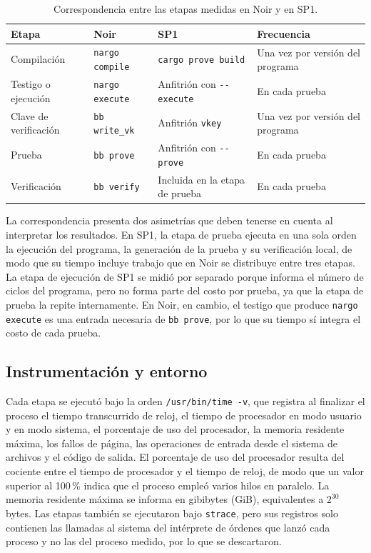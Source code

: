 \begin{table}[htbp]
	\centering
	\caption{Correspondencia entre las etapas medidas en Noir y en SP1.}
	\label{tab:metodologia_etapas}
	\small
	\begin{tabular}{>{\raggedright\arraybackslash}p{2.6cm} >{\raggedright\arraybackslash}p{4.3cm} >{\raggedright\arraybackslash}p{4.3cm} >{\raggedright\arraybackslash}p{2.6cm}}
		\toprule
		\textbf{Etapa} & \textbf{Noir} & \textbf{SP1} & \textbf{Frecuencia} \\
		\midrule
		Compilación & \texttt{nargo compile} & \texttt{cargo prove build} & Una vez por versión
		del programa \\
		\addlinespace
		Testigo o ejecución & \texttt{nargo execute} & Anfitrión con \texttt{-{}-execute} & En cada
		prueba \\
		\addlinespace
		Clave de verificación & \texttt{bb write\_vk} & Anfitrión \texttt{vkey} & Una vez por
		versión del programa \\
		\addlinespace
		Prueba & \texttt{bb prove} & Anfitrión con \texttt{-{}-prove} & En cada prueba \\
		\addlinespace
		Verificación & \texttt{bb verify} & Incluida en la etapa de prueba & En cada prueba \\
		\bottomrule
	\end{tabular}
\end{table}

La correspondencia presenta dos asimetrías que deben tenerse en cuenta al interpretar los
resultados. En SP1, la etapa de prueba ejecuta en una sola orden la ejecución del programa, la
generación de la prueba y su verificación local, de modo que su tiempo incluye trabajo que en Noir
se distribuye entre tres etapas. La etapa de ejecución de SP1 se midió por separado porque informa
el número de ciclos del programa, pero no forma parte del costo por prueba, ya que la etapa de
prueba la repite internamente. En Noir, en cambio, el testigo que produce \texttt{nargo execute}
es una entrada necesaria de \texttt{bb prove}, por lo que su tiempo sí integra el costo de cada
prueba.

\subsection{Instrumentación y entorno}
\label{sec:metodologia_instrumentacion}

Cada etapa se ejecutó bajo la orden \texttt{/usr/bin/time -v}, que registra al finalizar el
proceso el tiempo transcurrido de reloj, el tiempo de procesador en modo usuario y en modo
sistema, el porcentaje de uso del procesador, la memoria residente máxima, los fallos de página,
las operaciones de entrada desde el sistema de archivos y el código de salida. El porcentaje de uso
del procesador resulta del cociente entre el tiempo de procesador y el tiempo de reloj, de modo que
un valor superior al 100\,\% indica que el proceso empleó varios hilos en paralelo. La memoria
residente máxima se informa en gibibytes (GiB), equivalentes a $2^{30}$ bytes. Las etapas también
se ejecutaron bajo \texttt{strace}, pero sus registros solo contienen las llamadas al sistema del
intérprete de órdenes que lanzó cada proceso y no las del proceso medido, por lo que se descartaron.

